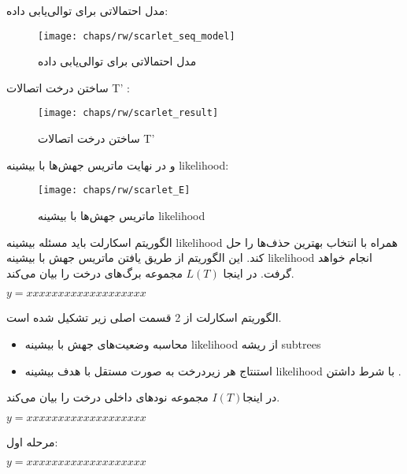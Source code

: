 مدل احتمالاتی برای توالی‌یابی داده:

\begin{figure}[!ht]
	\centerline{\texttt{[image: chaps/rw/scarlet\_seq\_model]}}
	\caption{مدل احتمالاتی برای توالی‌یابی داده}
	\label{fig:ch_rw:scarlet_seq_model}
\end{figure}

ساختن درخت اتصالات T’ : 

\begin{figure}[!ht]
	\centerline{\texttt{[image: chaps/rw/scarlet\_result]}}
	\caption{ساختن درخت اتصالات T’}
	\label{fig:ch_rw:scarlet_result}
\end{figure}

و  در نهایت ماتریس جهش‌ها   با بیشینه \gls{likelihood}: 


\begin{figure}[!ht]
	\centerline{\texttt{[image: chaps/rw/scarlet\_E]}}
	\caption{ماتریس جهش‌ها  با بیشینه \gls{likelihood}}
	\label{fig:ch_rw:scarlet_E}
\end{figure}


الگوریتم اسکارلت باید مسئله بیشینه \gls{likelihood} همراه با  انتخاب بهترین حذف‌ها را حل کند. این الگوریتم از طریق یافتن ماتریس جهش با بیشینه \gls{likelihood}  انجام خواهد گرفت. در اینجا $L(T)$
مجموعه برگ‌های درخت  را بیان می‌کند. 


\begin{math}
	y=xxxxxxxxxxxxxxxxxxx
\end{math}

الگوریتم اسکارلت از 2 قسمت اصلی زیر تشکیل شده است. 

\begin{itemize}
	\item      محاسبه وضعیت‌های جهش با بیشینه \gls{likelihood}  از ریشه \gls{subtrees} 
	\item استنتاج هر زیردرخت به صورت مستقل با هدف بیشینه \gls{likelihood} با شرط داشتن  .
\end{itemize}

در اینجا$I(T)$ مجموعه نودهای داخلی درخت  را بیان می‌کند. 

\begin{math}
	y=xxxxxxxxxxxxxxxxxxx
\end{math}

مرحله اول:

\begin{math}
	y=xxxxxxxxxxxxxxxxxxx
\end{math}


